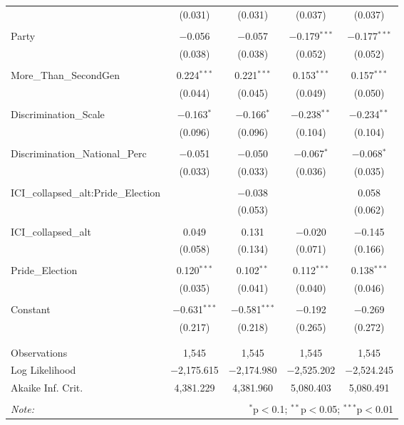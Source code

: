 \begin{table}[!htbp]
\begin{tabular}{@{\extracolsep{5pt}}lcccc}
  & (0.031) & (0.031) & (0.037) & (0.037) \\ 
  & & & & \\ 
 Party & $-$0.056 & $-$0.057 & $-$0.179$^{***}$ & $-$0.177$^{***}$ \\ 
  & (0.038) & (0.038) & (0.052) & (0.052) \\ 
  & & & & \\ 
 More\_Than\_SecondGen & 0.224$^{***}$ & 0.221$^{***}$ & 0.153$^{***}$ & 0.157$^{***}$ \\ 
  & (0.044) & (0.045) & (0.049) & (0.050) \\ 
  & & & & \\ 
 Discrimination\_Scale & $-$0.163$^{*}$ & $-$0.166$^{*}$ & $-$0.238$^{**}$ & $-$0.234$^{**}$ \\ 
  & (0.096) & (0.096) & (0.104) & (0.104) \\ 
  & & & & \\ 
 Discrimination\_National\_Perc & $-$0.051 & $-$0.050 & $-$0.067$^{*}$ & $-$0.068$^{*}$ \\ 
  & (0.033) & (0.033) & (0.036) & (0.035) \\ 
  & & & & \\ 
 ICI\_collapsed\_alt:Pride\_Election &  & $-$0.038 &  & 0.058 \\ 
  &  & (0.053) &  & (0.062) \\ 
  & & & & \\ 
 ICI\_collapsed\_alt & 0.049 & 0.131 & $-$0.020 & $-$0.145 \\ 
  & (0.058) & (0.134) & (0.071) & (0.166) \\ 
  & & & & \\ 
 Pride\_Election & 0.120$^{***}$ & 0.102$^{**}$ & 0.112$^{***}$ & 0.138$^{***}$ \\ 
  & (0.035) & (0.041) & (0.040) & (0.046) \\ 
  & & & & \\ 
 Constant & $-$0.631$^{***}$ & $-$0.581$^{***}$ & $-$0.192 & $-$0.269 \\ 
  & (0.217) & (0.218) & (0.265) & (0.272) \\ 
  & & & & \\ 
\hline \\[-1.8ex] 
Observations & 1,545 & 1,545 & 1,545 & 1,545 \\ 
Log Likelihood & $-$2,175.615 & $-$2,174.980 & $-$2,525.202 & $-$2,524.245 \\ 
Akaike Inf. Crit. & 4,381.229 & 4,381.960 & 5,080.403 & 5,080.491 \\ 
\hline 
\hline \\[-1.8ex] 
\textit{Note:}  & \multicolumn{4}{r}{$^{*}$p$<$0.1; $^{**}$p$<$0.05; $^{***}$p$<$0.01} \\ 
\end{tabular} 
\end{table} 
